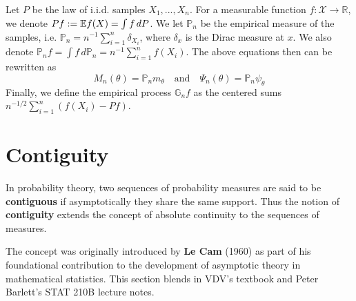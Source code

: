 \documentclass{article}
\begin{document}
Let $P$ be the law of i.i.d. samples $X_1, ..., X_n$. For a measurable function $f: \mathcal{X} \to \mathbb{R}$, we denote $Pf := \mathbb{E} f(X) = \int f\, dP$. We let $\mathbb{P}_n$ be the empirical measure of the samples, i.e. $\mathbb{P}_n = n^{-1} \sum_{i=1}^{n} \delta_{X_i}$, where $\delta_x$ is the Dirac measure at $x$. We also denote $\mathbb{P}_n f = \int f\, d\mathbb{P}_n = n^{-1} \sum_{i=1}^{n} f(X_i)$. The above equations then can be rewritten as 
\begin{equation}
    M_n(\theta) = \mathbb{P}_n m_\theta \quad \text{and} \quad \Psi_n(\theta) = \mathbb{P}_n \psi_\theta
\end{equation}
Finally, we define the empirical process $\mathbb{G}_n f$ as the centered sums $n^{-1/2} \sum_{i=1}^n \left( f(X_i) - Pf \right)$.
\newpage
\section{Contiguity}
\begin{note}
    In probability theory, two sequences of probability measures are said to be \textbf{contiguous} if asymptotically they share the same support. Thus the notion of \textbf{contiguity} extends the concept of absolute continuity to the sequences of measures.

    The concept was originally introduced by \textbf{Le Cam} (1960) as part of his foundational contribution to the development of asymptotic theory in mathematical statistics. This section blends in VDV's textbook and Peter Barlett's STAT 210B lecture notes\footnotemark.
\end{note}
\end{document}
